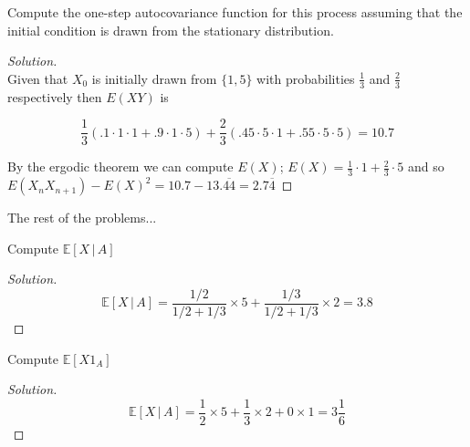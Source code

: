 \documentclass[12pt]{article}
\newenvironment{problem}[2][Problem]{\begin{trivlist}
\item[\hskip \labelsep {\bfseries #1}\hskip \labelsep {\bfseries #2.}]}{\end{trivlist}}
\newenvironment{solution}
  {\begin{proof}[Solution]\renewcommand{\qedsymbol}{}}
  {\end{proof}}
\begin{document}
\begin{problem}{3(b)}
Compute the one-step autocovariance function for this process assuming that the initial condition is drawn from the stationary distribution.
\end{problem}
 
\begin{solution}\ \\ 

Given that $X_0$ is initially drawn from $\{1,5\}$ with probabilities $\frac{1}{3}$ and $\frac{2}{3}$ respectively then $E(XY)$ is 

$$
\frac{1}{3}(.1 \cdot 1 \cdot 1 + .9 \cdot 1 \cdot 5) + \frac{2}{3}(.45 \cdot 5 \cdot 1 + .55 \cdot 5 \cdot 5) = 10.7
$$

By the ergodic theorem we can compute $E(X)$; $E(X) = \frac{1}{3}\cdot 1 + \frac{2}{3} \cdot 5$ and so $E(X_n X_{n+1}) - E(X)^2 = 10.7 - 13.\overline{44} = 2.7\overline{4}$


\end{solution} 

\begin{bf}The rest of the problems...\end{bf}

\begin{problem}{2(a)} 
Compute $\mathbb{E}[X \, | \, A]$
\end{problem}
\begin{solution}\ \\

$$\mathbb{E}[X \, | \, A] = \frac{1/2}{1/2+1/3}\times 5 + \frac{1/3}{1/2+1/3}\times 2 = 3.8$$

\end{solution}

\begin{problem}{2(b)} 
Compute $\mathbb{E}[X 1_{A}]$
\end{problem}
\begin{solution}\ \\

$$\mathbb{E}[X \, | \, A] = \frac{1}{2}\times 5 + \frac{1}{3}\times 2 + 0 \times 1 = 3\frac{1}{6}$$

\end{solution}
\end{document}
